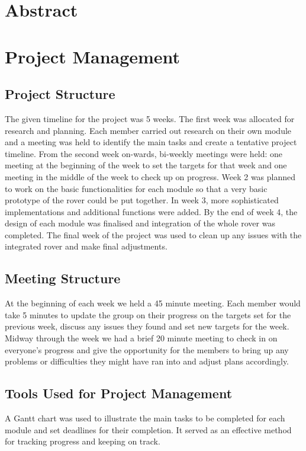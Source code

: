 \documentclass[10pt,twoside]{article}
\begin{document}


\newpage

\tableofcontents

\newpage
\section{Abstract}
\section{Project Management}
\subsection{Project Structure}
The given timeline for the project was 5 weeks. The first week was allocated for research and planning. Each member carried out research on their own module and a meeting was held to identify the main tasks and create a tentative project timeline. From the second week on-wards, bi-weekly meetings were held: one meeting at the beginning of the week to set the targets for that week and one meeting in the middle of the week to check up on progress. Week 2 was planned to work on the basic functionalities for each module so that a very basic prototype of the rover could be put together. In week 3, more sophisticated implementations and additional functions were added. By the end of week 4, the design of each module was finalised and integration of the whole rover was completed. The final week of the project was used to clean up any issues with the integrated rover and make final adjustments. 

\subsection{Meeting Structure}
At the beginning of each week we held a 45 minute meeting. Each member would take 5 minutes to update the group on their progress on the targets set for the previous week, discuss any issues they found and set new targets for the week. Midway through the week we had a brief 20 minute meeting to check in on everyone’s progress and give the opportunity for the members to bring up any problems or difficulties they might have ran into and adjust plans accordingly.

\subsection{Tools Used for Project Management}
A Gantt chart was used to illustrate the main tasks to be completed for each module and set deadlines for their completion. It served as an effective method for tracking progress and keeping on track. 
\end{document}
